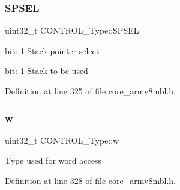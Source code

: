 \subsubsection{\texorpdfstring{S\+P\+S\+EL}{SPSEL}}
{\footnotesize\ttfamily uint32\+\_\+t C\+O\+N\+T\+R\+O\+L\+\_\+\+Type\+::\+S\+P\+S\+EL}

bit\+: 1 Stack-\/pointer select

bit\+: 1 Stack to be used 

Definition at line 325 of file core\+\_\+armv8mbl.\+h.

\mbox{\label{union_c_o_n_t_r_o_l___type_a6b642cca3d96da660b1198c133ca2a1f}} 
\subsubsection{\texorpdfstring{w}{w}}
{\footnotesize\ttfamily uint32\+\_\+t C\+O\+N\+T\+R\+O\+L\+\_\+\+Type\+::w}

Type used for word access 

Definition at line 328 of file core\+\_\+armv8mbl.\+h.



